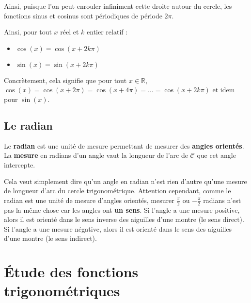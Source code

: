 	Ainsi, puisque l'on peut enrouler infiniment cette droite autour du cercle, les fonctions sinus et cosinus sont périodiques de période $2\pi$.

	\begin{formula}[Périodicité]
		Ainsi, pour tout $x$ réel et $k$ entier relatif :
		\begin{itemize}
			\item $\cos(x) = \cos(x + 2k\pi)$
			\item $\sin(x) = \sin(x + 2k\pi)$
		\end{itemize}
	\end{formula}

	\begin{tip}
		Concrètement, cela signifie que pour tout $x \in \mathbb{R}$, $\cos(x) = \cos(x + 2\pi) = \cos(x + 4\pi) = \dots = \cos(x + 2k\pi)$ et idem pour $\sin(x)$.
	\end{tip}

	\subsection{Le radian}

	\begin{formula}[Définition]
		Le \textbf{radian} est une unité de mesure permettant de mesurer des \textbf{angles orientés}. La \textbf{mesure} en radians d'un angle vaut la longueur de l'arc de $\mathcal{C}$ que cet angle intercepte.
	\end{formula}


	\begin{tip}
		Cela veut simplement dire qu'un angle en radian n'est rien d'autre qu'une mesure de longueur d'arc du cercle trigonométrique.
		\newpar
		Attention cependant, comme le radian est une unité de mesure d'angles orientés, mesurer $\frac{\pi}{2}$ ou $-\frac{\pi}{2}$ radians n'est pas la même chose car les angles ont \textbf{un sens}.
		\newpar
		Si l'angle a une mesure positive, alors il est orienté dans le sens inverse des aiguilles d'une montre (le sens direct).
		\newline
		Si l'angle a une mesure négative, alors il est orienté dans le sens des aiguilles d'une montre (le sens indirect).
	\end{tip}

	\section{Étude des fonctions trigonométriques}

